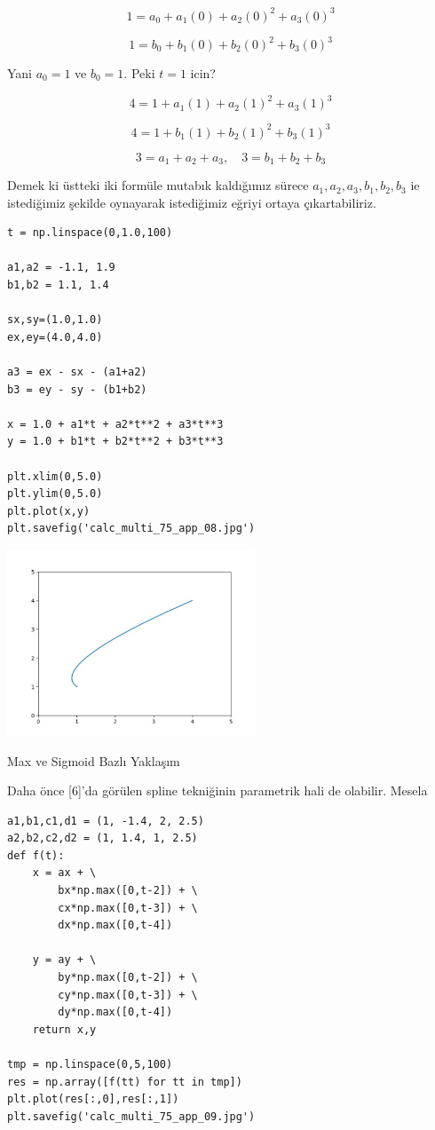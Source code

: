 \documentclass[12pt,fleqn]{article}\usepackage{../../common}
\begin{document}
$$
1 = a_0 + a_1 (0) + a_2 (0)^2 + a_3 (0)^3
$$

$$
1 = b_0 + b_1 (0) + b_2 (0)^2 + b_3 (0)^3
$$

Yani  $a_0=1$ ve $b_0=1$. Peki $t=1$ icin?

$$
4 = 1 + a_1 (1) + a_2 (1)^2 + a_3 (1)^3 
$$

$$
4 = 1 + b_1 (1) + b_2 (1)^2 + b_3 (1)^3 
$$

$$
3 = a_1 + a_2 + a_3, \quad 3 = b_1 + b_2 + b_3
$$

Demek ki üstteki iki formüle mutabık kaldığımız sürece
$a_1,a_2,a_3,b_1,b_2,b_3$ ie istediğimiz şekilde oynayarak istediğimiz
eğriyi ortaya çıkartabiliriz. 

\begin{verbatim}
t = np.linspace(0,1.0,100)

a1,a2 = -1.1, 1.9
b1,b2 = 1.1, 1.4

sx,sy=(1.0,1.0)
ex,ey=(4.0,4.0)

a3 = ex - sx - (a1+a2)
b3 = ey - sy - (b1+b2)

x = 1.0 + a1*t + a2*t**2 + a3*t**3
y = 1.0 + b1*t + b2*t**2 + b3*t**3

plt.xlim(0,5.0)
plt.ylim(0,5.0)
plt.plot(x,y)
plt.savefig('calc_multi_75_app_08.jpg')
\end{verbatim}

\includegraphics[width=20em]{calc_multi_75_app_08.jpg}

Max ve Sigmoid Bazlı Yaklaşım

Daha önce [6]'da görülen spline tekniğinin parametrik hali de
olabilir. Mesela 

\begin{verbatim}
a1,b1,c1,d1 = (1, -1.4, 2, 2.5)
a2,b2,c2,d2 = (1, 1.4, 1, 2.5)
def f(t):
    x = ax + \
        bx*np.max([0,t-2]) + \
        cx*np.max([0,t-3]) + \
        dx*np.max([0,t-4])
	   
    y = ay + \
        by*np.max([0,t-2]) + \
        cy*np.max([0,t-3]) + \
        dy*np.max([0,t-4])
    return x,y	   
    
tmp = np.linspace(0,5,100)
res = np.array([f(tt) for tt in tmp])
plt.plot(res[:,0],res[:,1])
plt.savefig('calc_multi_75_app_09.jpg')
\end{verbatim}
\end{document}
